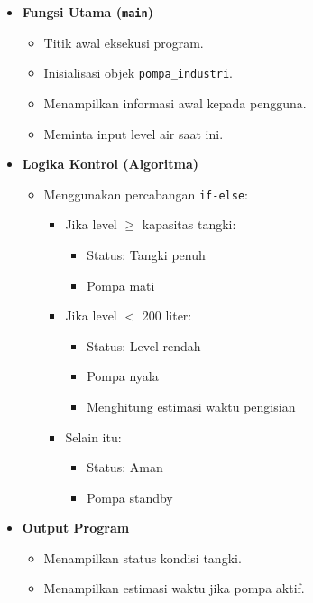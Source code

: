 \documentclass[12pt,a4paper]{article}
\begin{document}
\begin{itemize}
\item \textbf{Fungsi Utama (\texttt{main})}
\begin{itemize}
    \item Titik awal eksekusi program.
    \item Inisialisasi objek \texttt{pompa\_industri}.
    \item Menampilkan informasi awal kepada pengguna.
    \item Meminta input level air saat ini.
\end{itemize}

\item \textbf{Logika Kontrol (Algoritma)}
\begin{itemize}
    \item Menggunakan percabangan \texttt{if-else}:
    \begin{itemize}
        \item Jika level $\geq$ kapasitas tangki:
        \begin{itemize}
            \item Status: Tangki penuh
            \item Pompa mati
        \end{itemize}
        \item Jika level $<$ 200 liter:
        \begin{itemize}
            \item Status: Level rendah
            \item Pompa nyala
            \item Menghitung estimasi waktu pengisian
        \end{itemize}
        \item Selain itu:
        \begin{itemize}
            \item Status: Aman
            \item Pompa standby
        \end{itemize}
    \end{itemize}
\end{itemize}

\item \textbf{Output Program}
\begin{itemize}
    \item Menampilkan status kondisi tangki.
    \item Menampilkan estimasi waktu jika pompa aktif.
\end{itemize}


\end{itemize}
\end{document}
